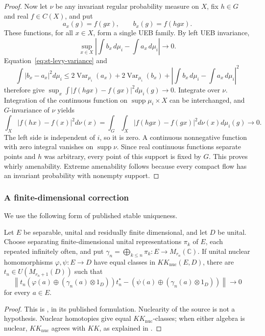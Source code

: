 \begin{proof}
Now let \(\nu\) be any invariant regular probability measure on \(X\),
fix \(h\in G\) and real \(f\in C(X)\), and put
\[
 a_x(g)=f(gx),\qquad b_x(g)=f(hgx).
\]
These functions, for all \(x\in X\), form a single UEB family.
By left UEB invariance,
\[
 \sup_{x\in X}\left|\int b_x\,d\mu_i-\int a_x\,d\mu_i\right|\longrightarrow0.
\]
Equation~\eqref{eq:st-levy-variance} and
\[
 \int|b_x-a_x|^2d\mu_i
 \leq2\operatorname{Var}_{\mu_i}(a_x)
      +2\operatorname{Var}_{\mu_i}(b_x)
      +\left|\int b_x\,d\mu_i-\int a_x\,d\mu_i\right|^2
\]
therefore give \(\sup_x\int|f(hgx)-f(gx)|^2d\mu_i(g)\to0\).
Integrate over \(\nu\). Integration of the continuous function on
\(\operatorname{supp}\mu_i\times X\) can be interchanged, and
\(G\)-invariance of \(\nu\) yields
\[
 \int_X|f(hx)-f(x)|^2d\nu(x)
 =\int_G\int_X|f(hgx)-f(gx)|^2d\nu(x)d\mu_i(g)
 \longrightarrow0.
\]
The left side is independent of \(i\), so it is zero.
A continuous nonnegative function with zero integral vanishes on
\(\operatorname{supp}\nu\). Since real continuous functions separate
points and \(h\) was arbitrary, every point of this support is fixed
by \(G\). This proves whirly amenability.
Extreme amenability follows because every compact flow has an
invariant probability with nonempty support.
\end{proof}


\subsubsection{A finite-dimensional correction}
We use the following form of published stable uniqueness.

\begin{theorem}\label{thm:st-de}
Let \(E\) be separable, unital and residually finite dimensional, and
let \(D\) be unital. Choose separating finite-dimensional unital
representations \(\pi_k\) of \(E\), each repeated infinitely often,
and put \(\gamma_n=\bigoplus_{k\leq n}\pi_k:E\to M_{r_n}(\mathbb C)\).
If unital nuclear homomorphisms \(\varphi,\psi:E\to D\) have equal
classes in \(KK_{\mathrm{nuc}}(E,D)\), there are
\(t_n\in U(M_{r_n+1}(D))\) such that
\[
 \left\|t_n(\varphi(a)\oplus(\gamma_n(a)\otimes1_D))t_n^*
       -(\psi(a)\oplus(\gamma_n(a)\otimes1_D))\right\|\longrightarrow0
\]
for every \(a\in E\).
\end{theorem}
\begin{proof}
This is \cite[Corollary 4.6]{DadarlatEilers2002}, in its published formulation.
Nuclearity of the source is not a hypothesis. Nuclear homotopies give
equal \(KK_{\mathrm{nuc}}\)-classes; when either algebra is nuclear,
\(KK_{\mathrm{nuc}}\) agrees with \(KK\), as explained in
\cite[Section 3.1]{DadarlatEilers2002}.
\end{proof}

